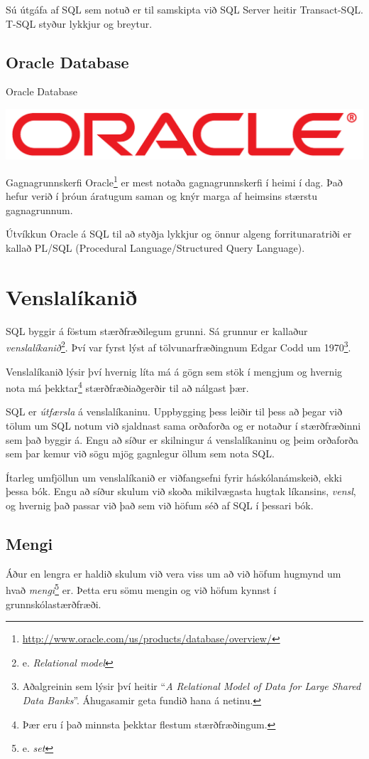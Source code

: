 Sú útgáfa af SQL sem notuð er til samskipta við SQL Server heitir Transact-SQL. T-SQL styður lykkjur og breytur.
\subsection{Oracle Database}
\label{undirkafli:oracle}
\begin{marginfigure}
\caption{Oracle Database}
\label{mynd:oracle}
\centering
\includegraphics[width=\linewidth]{myndir/oracle}
\end{marginfigure}
Gagnagrunnskerfi Oracle\footnote{\url{http://www.oracle.com/us/products/database/overview/}} er mest notaða gagnagrunnskerfi í heimi í dag. Það hefur verið í þróun áratugum saman og knýr marga af heimsins stærstu gagnagrunnum.

Útvíkkun Oracle á SQL til að styðja lykkjur og önnur algeng forritunaratriði er kallað PL/SQL (Procedural Language/Structured Query Language).
\section{Venslalíkanið}
SQL byggir á föstum stærðfræðilegum grunni. Sá grunnur er kallaður \emph{venslalíkanið}\footnote{e. \emph{Relational model}}. Því var fyrst lýst af tölvunarfræðingnum Edgar Codd um 1970\footnote{Aðalgreinin sem lýsir því heitir ``\emph{A Relational Model of Data for Large Shared Data Banks}''. Áhugasamir geta fundið hana á netinu.}.

Venslalíkanið lýsir því hvernig líta má á gögn sem stök í mengjum og hvernig nota má þekktar\footnote{Þær eru í það minnsta þekktar flestum stærðfræðingum.} stærðfræðiaðgerðir til að nálgast þær. 

SQL er \emph{útfærsla} á venslalíkaninu. Uppbygging þess leiðir til þess að þegar við tölum um SQL notum við sjaldnast sama orðaforða og er notaður í stærðfræðinni sem það byggir á. Engu að síður er skilningur á venslalíkaninu og þeim orðaforða sem þar kemur við sögu mjög gagnlegur öllum sem nota SQL.

Ítarleg umfjöllun um venslalíkanið er viðfangsefni fyrir háskólanámskeið, ekki þessa bók. Engu að síður skulum við skoða mikilvægasta hugtak líkansins, \emph{vensl}, og hvernig það passar við það sem við höfum séð af SQL í þessari bók.
\subsection{Mengi}
Áður en lengra er haldið skulum við vera viss um að við höfum hugmynd um hvað \emph{mengi}\footnote{e. \emph{set}} er. Þetta eru sömu mengin og við höfum kynnst í grunnskólastærðfræði.

